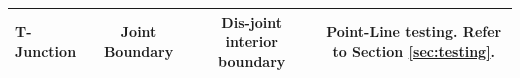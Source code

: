 \begin{table}
\begin{tabularx}{\textwidth}{|m{1.5cm}|C|C|C|}
\centering T-Junction &  Joint Boundary&  Dis-joint interior boundary& Point-Line testing.  Refer to Section \ref{sec:testing}. \\ \hline

\end{tabularx}
\end{table}
